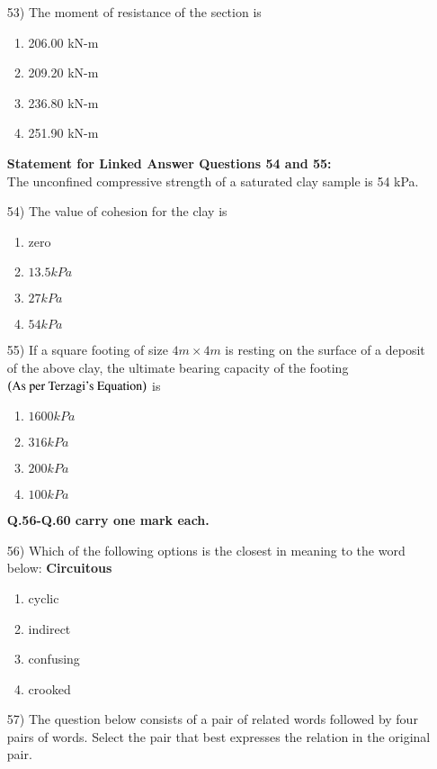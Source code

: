 \documentclass[journal]{IEEEtran}
\begin{document}
\begin{enumerate}
\item[53)] The moment of resistance of the section is
\begin{enumerate}
    \item 206.00 kN-m
    \item 209.20 kN-m
    \item 236.80 kN-m
    \item 251.90 kN-m
\end{enumerate}
\bigskip
\textbf{Statement for Linked Answer Questions 54 and 55:} \\
The unconfined compressive strength of a saturated clay sample is 54 kPa.
\bigskip
\item[54)] The value of cohesion for the clay is
\begin{multicols}{2}
\begin{enumerate}
    \item zero
    \item $13.5 kPa$
    \item $27 kPa$
    \item $54 kPa$
\end{enumerate}
\end{multicols}
\item[55)] If a square footing of size $4m\times 4m$ is resting on the surface of a deposit of the above clay, the ultimate bearing capacity of the footing$\left(\text{As per Terzagi's Equation}\right)$ is
\begin{multicols}{2}
\begin{enumerate}
    \item $1600 kPa$
    \item $316kPa$
    \item $200kPa$
    \item $100 kPa$
\end{enumerate}
\end{multicols}
\bigskip
\textbf{Q.56-Q.60 carry one mark each.}
\bigskip
\item[56)] Which of the following options is the closest in meaning to the word below:  
\textbf{Circuitous}
\begin{enumerate}
    \item cyclic
    \item indirect
    \item confusing
    \item crooked
\end{enumerate}
\item[57)] The question below consists of a pair of related words followed by four pairs of words. Select the pair that best expresses the relation in the original pair.  

\end{enumerate}
\end{document}
